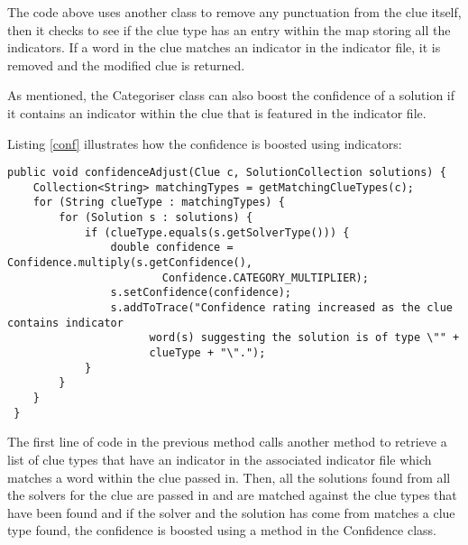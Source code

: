 The code above uses another class to remove any punctuation from the clue
itself, then it checks to see if the clue type has an entry within the map
storing all  the indicators. If a word in the clue matches an indicator in the
indicator file, it is  removed and the modified clue is returned.

As mentioned, the Categoriser class can also boost the confidence of a solution
if  it contains an indicator within the clue that is featured in the indicator
file.

Listing \ref{conf} illustrates how the confidence is boosted using indicators:

\begin{lstlisting}[caption={Boosting the confidence of a solution},
                   label=conf]  
 public void confidenceAdjust(Clue c, SolutionCollection solutions) {
	Collection<String> matchingTypes = getMatchingClueTypes(c);
	for (String clueType : matchingTypes) {
		for (Solution s : solutions) {
			if (clueType.equals(s.getSolverType())) {
				double confidence = Confidence.multiply(s.getConfidence(),
						Confidence.CATEGORY_MULTIPLIER);
				s.setConfidence(confidence);
				s.addToTrace("Confidence rating increased as the clue contains indicator
                      word(s) suggesting the solution is of type \"" + 
                      clueType + "\".");
			}
		}
	}
 }
\end{lstlisting}

The first line of code in the previous method calls another method to retrieve  a
list of clue types that have an indicator in the associated indicator file which
matches a word  within the clue passed in. Then, all the solutions found from
all the solvers for the clue are passed in and are matched against the clue types that
have been found and if the solver and the solution has come  from matches a clue
type found, the confidence is boosted using a method in the Confidence class.
